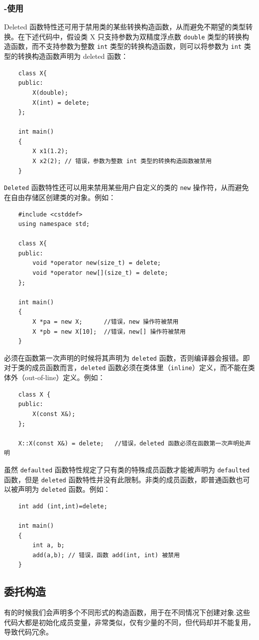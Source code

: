 \documentclass[UTF8,a4paper,12pt]{ctexbook} %
\begin{document}
			\subsubsection{-使用}
				Deleted 函数特性还可用于禁用类的某些转换构造函数，从而避免不期望的类型转换。在下述代码中，假设类 X 只支持参数为双精度浮点数 \verb|double| 类型的转换构造函数，而不支持参数为整数 \verb|int| 类型的转换构造函数，则可以将参数为 \verb|int| 类型的转换构造函数声明为 deleted 函数：
					\begin{lstlisting}
	class X{ 
	public: 
		X(double);              
		X(int) = delete;     
	}; 
	
	int main()
	{ 
		X x1(1.2);        
		X x2(2); // 错误，参数为整数 int 类型的转换构造函数被禁用          
	}					
					\end{lstlisting}
				
				\verb|Deleted| 函数特性还可以用来禁用某些用户自定义的类的 \verb|new| 操作符，从而避免在自由存储区创建类的对象。例如：
					\begin{lstlisting}
	#include <cstddef> 
	using namespace std; 
	
	class X{ 
	public: 
		void *operator new(size_t) = delete; 
		void *operator new[](size_t) = delete; 
	}; 
	
	int main()
	{ 
		X *pa = new X;      //错误，new 操作符被禁用
		X *pb = new X[10];  //错误，new[] 操作符被禁用
	}					
					\end{lstlisting}
					
				必须在函数第一次声明的时候将其声明为 \verb|deleted| 函数，否则编译器会报错。即对于类的成员函数而言，\verb|deleted| 函数必须在类体里（\verb|inline|）定义，而不能在类体外（out-of-line）定义。例如：
					\begin{lstlisting}
	class X { 
	public:  
		X(const X&); 
	}; 
	
	X::X(const X&) = delete;   //错误，deleted 函数必须在函数第一次声明处声明						
					\end{lstlisting}
				
				虽然 \verb|defaulted| 函数特性规定了只有类的特殊成员函数才能被声明为 \verb|defaulted| 函数，但是 \verb|deleted| 函数特性并没有此限制。非类的成员函数，即普通函数也可以被声明为 \verb|deleted| 函数。例如：
					\begin{lstlisting}
	int add (int,int)=delete; 
	
	int main()
	{ 
		int a, b; 
		add(a,b); // 错误，函数 add(int, int) 被禁用
	}					
					\end{lstlisting}
				
				
		\subsection{委托构造}
			有的时候我们会声明多个不同形式的构造函数，用于在不同情况下创建对象.这些代码大都是初始化成员变量，非常类似，仅有少量的不同，但代码却并不能复用，导致代码冗余。
			
\end{document}
